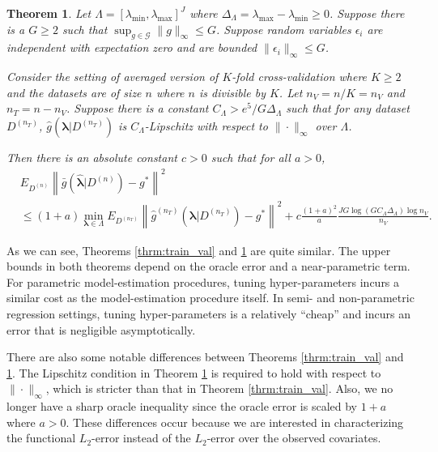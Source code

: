 \documentclass[12pt]{article} %
\newtheorem{theorem}{Theorem}
\theoremstyle{definition}
\begin{document}
\begin{theorem}
	\label{thrm:kfold}
	Let $\Lambda=[\lambda_{\min},\lambda_{\max}]^{J}$ where $\Delta_{\Lambda} = \lambda_{\max} - \lambda_{\min} \ge 0$. Suppose there is a $G \ge  2$ such that $\sup_{g \in \mathcal{G}} \|g\|_\infty \le G$. Suppose random variables $\epsilon_i$ are independent with expectation zero and are bounded $\| \epsilon_i \|_\infty \le G$.
	
	Consider the setting of averaged version of $K$-fold cross-validation where $K \ge 2$ and the datasets are of size $n$ where $n$ is divisible by $K$. Let $n_V = n/K = n_V$ and $n_T = n - n_V$.  Suppose there is a constant $C_\Lambda > e^5/G\Delta_{\Lambda}$ such that for any dataset $D^{(n_T)}$, $\hat g (\boldsymbol{\lambda} | D^{(n_T)})$ is $C_\Lambda$-Lipschitz with respect to $\| \cdot \|_\infty$ over $\Lambda$.
	
	Then there is an absolute constant $c > 0$ such that for all $a > 0$,
	\begin{align*}
	&
	E_{D^{(n)}}
	\left \| \bar{g} ( \hat{\boldsymbol \lambda} | {D^{(n)}} ) - g^* \right \|^2 
	\\
	&\le
	(1+a) \min_{\boldsymbol{\lambda} \in \Lambda}  
	E_{D^{(n_T)}}
	\left \| \hat{g}^{(n_T)}(\boldsymbol \lambda | D^{(n_T)}) - g^* \right \|^2 
	+ c \frac{(1+a)^2}{a} \frac{J G \log (GC_\Lambda \Delta_{\Lambda} ) \log n_V }{n_V}.
	\end{align*}
\end{theorem}

As we can see, Theorems \ref{thrm:train_val} and \ref{thrm:kfold} are quite similar. The upper bounds in both theorems depend on the oracle error and a near-parametric term. For parametric model-estimation procedures, tuning hyper-parameters incurs a similar cost as the model-estimation procedure itself. In semi- and non-parametric regression settings, tuning hyper-parameters is a relatively ``cheap'' and incurs an error that is negligible asymptotically.

There are also some notable differences between Theorems \ref{thrm:train_val} and \ref{thrm:kfold}. The Lipschitz condition in Theorem \ref{thrm:kfold} is required to hold with respect to $\| \cdot \|_\infty$, which is stricter than that in Theorem \ref{thrm:train_val}. Also, we no longer have a sharp oracle inequality since the oracle error is scaled by $1+a$ where $a > 0$. These differences occur because we are interested in characterizing the functional $L_2$-error instead of the $L_2$-error over the observed covariates.
\end{document}
